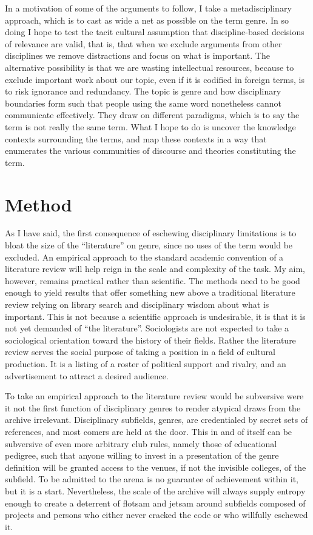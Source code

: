\documentclass[]{book}
\theoremstyle{definition}
\theoremstyle{definition}
\theoremstyle{definition}
\theoremstyle{remark}
\begin{document}
In a motivation of some of the arguments to follow, I take a
metadisciplinary approach, which is to cast as wide a net as possible on
the term genre. In so doing I hope to test the tacit cultural assumption
that discipline-based decisions of relevance are valid, that is, that
when we exclude arguments from other disciplines we remove distractions
and focus on what is important. The alternative possibility is that we
are wasting intellectual resources, because to exclude important work
about our topic, even if it is codified in foreign terms, is to risk
ignorance and redundancy. The topic is genre and how disciplinary
boundaries form such that people using the same word nonetheless cannot
communicate effectively. They draw on different paradigms, which is to
say the term is not really the same term. What I hope to do is uncover
the knowledge contexts surrounding the terms, and map these contexts in
a way that enumerates the various communities of discourse and theories
constituting the term.

\hypertarget{method}{%
\section{Method}\label{method}}

As I have said, the first consequence of eschewing disciplinary
limitations is to bloat the size of the ``literature'' on genre, since
no uses of the term would be excluded. An empirical approach to the
standard academic convention of a literature review will help reign in
the scale and complexity of the task. My aim, however, remains practical
rather than scientific. The methods need to be good enough to yield
results that offer something new above a traditional literature review
relying on library search and disciplinary wisdom about what is
important. This is not because a scientific approach is undesirable, it
is that it is not yet demanded of ``the literature''. Sociologists are
not expected to take a sociological orientation toward the history of
their fields. Rather the literature review serves the social purpose of
taking a position in a field of cultural production. It is a listing of
a roster of political support and rivalry, and an advertisement to
attract a desired audience.

To take an empirical approach to the literature review would be
subversive were it not the first function of disciplinary genres to
render atypical draws from the archive irrelevant. Disciplinary
subfields, genres, are credentialed by secret sets of references, and
most comers are held at the door. This in and of itself can be
subversive of even more arbitrary club rules, namely those of
educational pedigree, such that anyone willing to invest in a
presentation of the genre definition will be granted access to the
venues, if not the invisible colleges, of the subfield. To be admitted
to the arena is no guarantee of achievement within it, but it is a
start. Nevertheless, the scale of the archive will always supply entropy
enough to create a deterrent of flotsam and jetsam around subfields
composed of projects and persons who either never cracked the code or
who willfully eschewed it.
\end{document}
